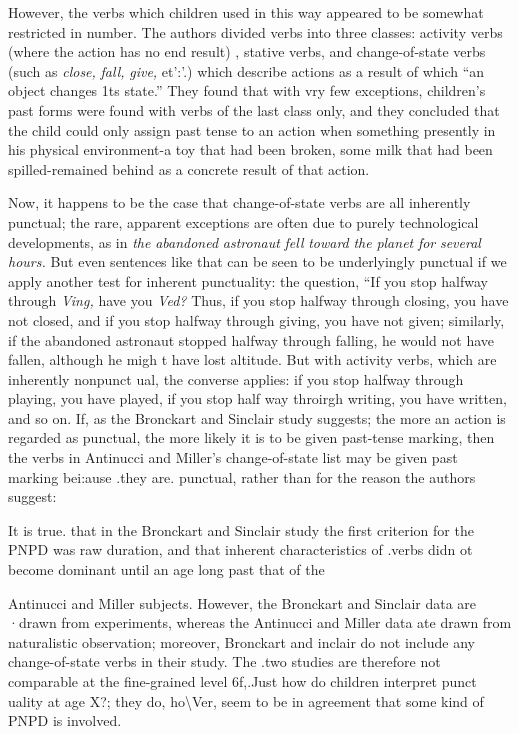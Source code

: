 However, the verbs which children used in this way appeared
to be somewhat restricted in number. The authors divided verbs into three classes: activity verbs (where the action has no end result) , stative verbs, and change-of-state verbs (such as \textit{close,} \textit{fall,} \textit{give,} et':'.) which describe actions as a result of which ``an object changes 1ts state.'' They found that with vry few exceptions, children's past
forms were found with verbs of the last class only, and they concluded that the child could only assign past tense to an action when some\-thing presently in his physical environment-a toy that had been broken, some milk that had been spilled-remained behind as a concrete result of that action.

Now, it happens to be the case that change-of-state verbs are all inherently punctual; the rare, apparent exceptions are often due to purely technological developments, as in \textit{the} \textit{abandoned} \textit{astronaut} \textit{fell} \textit{toward} \textit{the} \textit{planet} \textit{for} \textit{several} \textit{hours.} But even sentences like that can be
seen to be underlyingly punctual if we apply another test for inherent punctuality: the question, ``If you stop halfway through \textit{Vi}\textit{n}\textit{g,} have you \textit{Ved?{\textquotedbl}} Thus, if you stop halfway through closing, you have not closed, and if you stop halfway through giving, you have not given; similarly, if the abandoned astronaut stopped halfway through falling, he would not have fallen, although he migh t have lost altitude. But with activity verbs, which are inherently nonpunct ual, the converse applies: if you stop halfway through playing, you have played, if you stop half\-
way throirgh writing, you have written, and so on. If, as the Bronckart
and Sinclair study suggests; the more an action is regarded as punctual,
the more likely it is to be given past-tense marking, then the verbs in
Antinucci and Miller's change-of-state list may be given past marking bei:ause .they are. punctual, rather than for the reason the authors suggest:
 

It is true. that in the Bronckart and Sinclair study the first cri\-terion for the PNPD was raw duration, and that inherent characteristics
of .verbs didn ot become dominant until an age long past that of the

Antinucci and Miller subjects. However, the Bronckart and Sinclair data are ·drawn from experiments, whereas the Antinucci and Miller data ate drawn from naturalistic observation; moreover, Bronckart and inclair do not include any change-of-state verbs in their study. The .two studies are therefore not comparable at the fine-grained level 6f,.{\textquotedbl}Just how do children interpret punct uality at age X?{\textquotedbl}; they do, ho{\textbackslash}Ver, seem to be in agreement that some kind of PNPD is involved.

